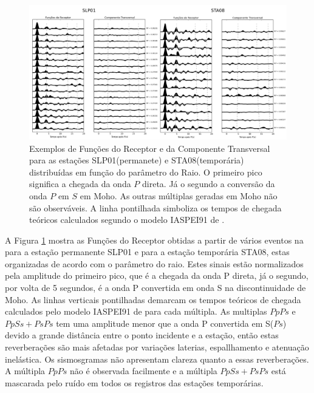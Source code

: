 \begin{figure}[!ht]
\centering
\includegraphics[scale=0.16]{Figs/RF_SLP01_STA08.png}
\caption[Exemplos de Funções do Receptor e da Componente Transversal para as estações SLP01(permanete) e STA08(temporária) distribuídas em função do parâmetro do Raio.]{Exemplos de Funções do Receptor e da Componente Transversal para as estações SLP01(permanete) e STA08(temporária) distribuídas em função do parâmetro do Raio. O primeiro pico significa a chegada da onda $P$ direta. Já o segundo a conversão da onda $P$ em $S$ em Moho. As outras múltiplas geradas em Moho não são observáveis. A linha pontilhada simboliza os tempos de chegada teóricos calculados segundo o modelo IASPEI91 de \cite{kennet_iaspei_1991}.}
\label{RF_SLP01_STA08}
\end{figure}

A Figura \ref{RF_SLP01_STA08} mostra as Funções do Receptor obtidas a partir de vários eventos na para a estação permanente SLP01 e para a estação temporária STA08, estas organizadas de acordo com o parâmetro do raio. Estes sinais estão normalizados pela amplitude do primeiro pico, que é a chegada da onda P direta, já o segundo, por volta de 5 segundos, é a onda P convertida em onda S na discontinuidade de Moho. As linhas verticais pontilhadas demarcam os tempos teóricos de chegada calculados pelo modelo IASPEI91 de \cite{kennet_iaspei_1991} para cada múltipla. As multiplas $PpPs$ e $PpSs+PsPs$ tem uma amplitude menor que a onda P convertida em S($Ps$) devido a grande distância entre o ponto incidente e a estação, então estas reverberações são mais afetadas por variações laterias, espallhamento e atenuação inelástica. Os sismosgramas não apresentam clareza quanto a essas reverberações. A múltipla $PpPs$ não é observada facilmente e a múltipla $PpSs+PsPs$ está mascarada pelo ruído em todos os registros das estações temporárias.

